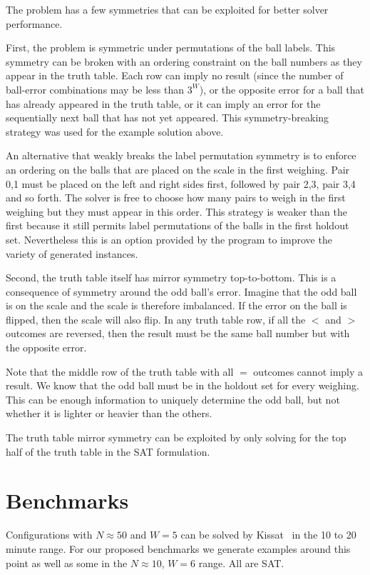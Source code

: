 \documentclass[conference]{IEEEtran}
\begin{document}
The problem has a few symmetries that can be exploited for better solver performance.

First, the problem is symmetric under permutations of the ball labels.
This symmetry can be broken with an ordering constraint on the ball numbers as they appear in the truth table.
Each row can imply no result (since the number of ball-error combinations may be less than $3^W$),
or the opposite error for a ball that has already appeared in the truth table, or it can imply an error
for the sequentially next ball that has not yet appeared.
This symmetry-breaking strategy was used for the example solution above.

An alternative that weakly breaks the label permutation symmetry is to enforce an ordering on the balls
that are placed on the scale in the first weighing. Pair 0,1 must be placed on the left and right sides first,
followed by pair 2,3, pair 3,4 and so forth.
The solver is free to choose how many pairs to weigh in the first weighing but they must appear in this order.
This strategy is weaker than the first because it still permits label permutations of the balls in the first holdout set.
Nevertheless this is an option provided by the program to improve the variety of generated instances.

Second, the truth table itself has mirror symmetry top-to-bottom.
This is a consequence of symmetry around the odd ball's error.
Imagine that the odd ball is on the scale and the scale is therefore imbalanced.
If the error on the ball is flipped, then the scale will also flip.
In any truth table row, if all the $<$ and $>$ outcomes are reversed, then the result must be the same ball number but with the opposite error.

Note that the middle row of the truth table with all $=$ outcomes cannot imply a result.
We know that the odd ball must be in the holdout set for every weighing.
This can be enough information to uniquely determine the odd ball, but not whether it is lighter or heavier than the others.

The truth table mirror symmetry can be exploited by only solving for the top half of the truth table in the SAT formulation.

\section{Benchmarks}

Configurations with $N \approx 50$ and $W=5$ can be solved by Kissat~\cite{k1} in the 10 to 20 minute range.
For our proposed benchmarks we generate examples around this point as well as some in the $N \approx 10$, $W=6$ range.
All are SAT.
\end{document}
